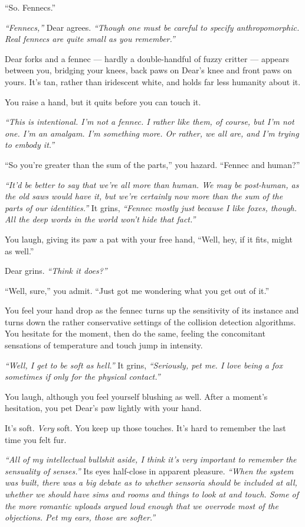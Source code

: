 ``So. Fennecs.''

\emph{``Fennecs,''} Dear agrees. \emph{``Though one must be careful to specify anthropomorphic. Real fennecs are quite small as you remember.''}

Dear forks and a fennec --- hardly a double-handful of fuzzy critter --- appears between you, bridging your knees, back paws on Dear's knee and front paws on yours. It's tan, rather than iridescent white, and holds far less humanity about it.

You raise a hand, but it quits before you can touch it.

\emph{``This is intentional. I'm not a fennec. I rather like them, of course, but I'm not one. I'm an amalgam. I'm something more. Or rather, we all are, and I'm trying to embody it.''}

``So you're greater than the sum of the parts,'' you hazard. ``Fennec and human?''

\emph{``It'd be better to say that we're all more than human. We may be post-human, as the old saws would have it, but we're certainly now more than the sum of the parts of our identities.''} It grins, \emph{``Fennec mostly just because I like foxes, though. All the deep words in the world won't hide that fact.''}

You laugh, giving its paw a pat with your free hand, ``Well, hey, if it fits, might as well.''

Dear grins. \emph{``Think it does?''}

``Well, sure,'' you admit. ``Just got me wondering what you get out of it.''

You feel your hand drop as the fennec turns up the sensitivity of its instance and turns down the rather conservative settings of the collision detection algorithms. You hesitate for the moment, then do the same, feeling the concomitant sensations of temperature and touch jump in intensity.

\emph{``Well, I get to be soft as hell.''} It grins, \emph{``Seriously, pet me. I love being a fox sometimes if only for the physical contact.''}

You laugh, although you feel yourself blushing as well. After a moment's hesitation, you pet Dear's paw lightly with your hand.

It's soft. \emph{Very} soft. You keep up those touches. It's hard to remember the last time you felt fur.

\emph{``All of my intellectual bullshit aside, I think it's very important to remember the sensuality of senses.''} Its eyes half-close in apparent pleasure. \emph{``When the system was built, there was a big debate as to whether sensoria should be included at all, whether we should have sims and rooms and things to look at and touch. Some of the more romantic uploads argued loud enough that we overrode most of the objections. Pet my ears, those are softer.''}

